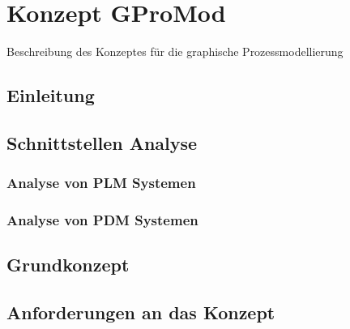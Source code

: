 \chapter{Konzept GProMod}
Beschreibung des Konzeptes für die graphische Prozessmodellierung
\section{Einleitung}

\section{Schnittstellen Analyse}
\subsection{Analyse von PLM Systemen}
\subsection{Analyse von PDM Systemen}

\section{Grundkonzept}
\section{Anforderungen an das Konzept}